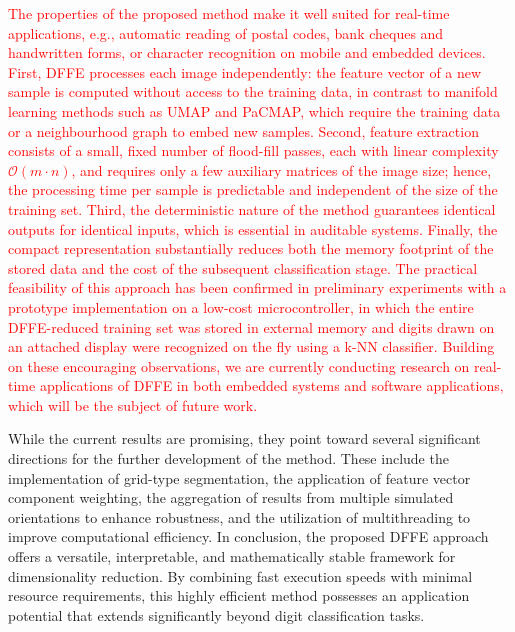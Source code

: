 \documentclass[a4paper,fleqn]{cas-dc}
\begin{document}
\textcolor{red}{The properties of the proposed method make it well suited for real-time applications, e.g., automatic reading of postal codes, bank cheques and handwritten forms, or character recognition on mobile and embedded devices. First, DFFE processes each image independently: the feature vector of a new sample is computed without access to the training data, in contrast to manifold learning methods such as UMAP and PaCMAP, which require the training data or a neighbourhood graph to embed new samples. Second, feature extraction consists of a small, fixed number of flood-fill passes, each with linear complexity $\mathcal{O}(m \cdot n)$, and requires only a few auxiliary matrices of the image size; hence, the processing time per sample is predictable and independent of the size of the training set. Third, the deterministic nature of the method guarantees identical outputs for identical inputs, which is essential in auditable systems. Finally, the compact representation substantially reduces both the memory footprint of the stored data and the cost of the subsequent classification stage. The practical feasibility of this approach has been confirmed in preliminary experiments with a prototype implementation on a low-cost microcontroller, in which the entire DFFE-reduced training set was stored in external memory and digits drawn on an attached display were recognized on the fly using a k-NN classifier. Building on these encouraging observations, we are currently conducting research on real-time applications of DFFE in both embedded systems and software applications, which will be the subject of future work.}

While the current results are promising, they point toward several significant directions for the further development of the method. These include the implementation of grid-type segmentation, the application of feature vector component weighting, the aggregation of results from multiple simulated orientations to enhance robustness, and the utilization of multithreading to improve computational efficiency. In conclusion, the proposed DFFE approach offers a versatile, interpretable, and mathematically stable framework for dimensionality reduction. By combining fast execution speeds with minimal resource requirements, this highly efficient method possesses an application potential that extends significantly beyond digit classification tasks.

\printcredits

%





\end{document}
